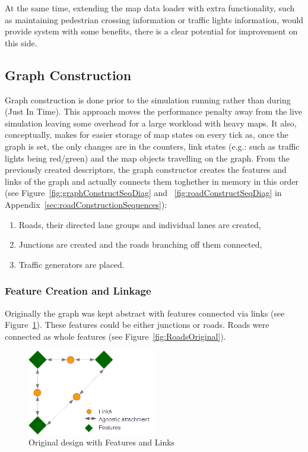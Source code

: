 At the same time, extending the map data loader with extra functionality, such as maintaining pedestrian crossing information or traffic lights information, would provide system with some benefits, there is a clear potential for improvement on this side.

\subsection{Graph Construction}

Graph construction is done prior to the simulation running rather than during (Just In Time). This approach moves the performance penalty away from the live simulation leaving some overhead for a large workload with heavy maps. It also, conceptually, makes for easier storage of map states on every tick as, once the graph is set, the only changes are in the counters, link states (e.g.: such as traffic lights being red/green) and the map objects travelling on the graph.
From the previously created descriptors, the graph constructor creates the features and links of the graph and actually connects them toghether in memory in this order (see Figure~\ref{fig:graphConstructSeqDiag} and ~\ref{fig:roadConstructSeqDiag} in Appendix~\ref{sec:roadConstructionSequences}):
\begin{enumerate}
	\item Roads, their directed lane groups and individual lanes are created,
	\item Junctions are created and the roads branching off them connected,
	\item Traffic generators are placed.
\end{enumerate}

\subsubsection{Feature Creation and Linkage}

Originally the graph was kept abstract with features connected via links (see Figure~\ref{fig:FeatureConnect}). These features could be either junctions or roads. Roads were connected as whole features (see Figure~\ref{fig:RoadsOriginal}).

\begin{figure}[h]
	\vspace{1.5em}
    \caption{Original design with Features and Links}
    \label{fig:FeatureConnect}
    \centering
    \includegraphics[width=0.50\textwidth]{figs/graphConstruction/OriginalConnections.png}
    \vspace{1.5em}
\end{figure}

